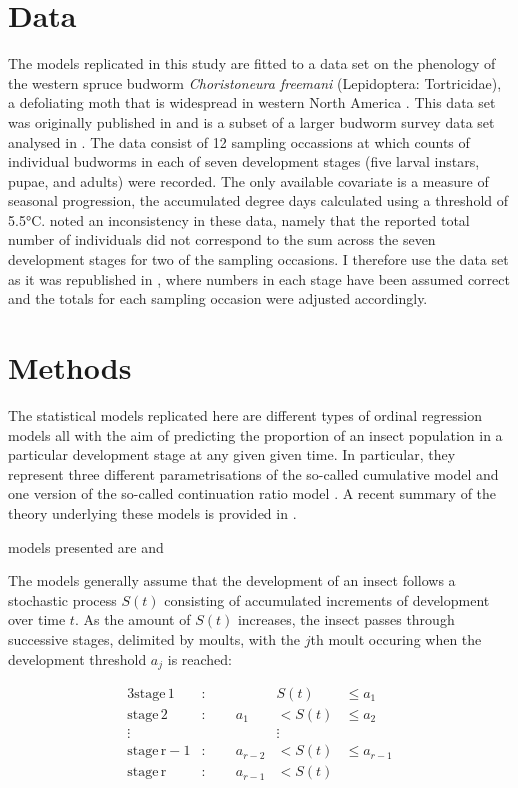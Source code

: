 \section{Data}
The models replicated in this study are fitted to a data set on the phenology of the western spruce budworm \emph{Choristoneura freemani} (Lepidoptera: Tortricidae), a defoliating moth that is widespread in western North America \citep{brookes1987western}. This data set was originally published in \citep{dennis1986stochastic} and is a subset of a larger budworm survey data set analysed in \citep{kemp1986}. The data consist of 12 sampling occassions at which counts of individual budworms in each of seven development stages (five larval instars, pupae, and adults) were recorded. The only available covariate is a measure of seasonal progression, the accumulated degree days calculated using a threshold of 5.5°C. \citet{candy1991modeling} noted an inconsistency in these data, namely that the reported total number of individuals did not correspond to the sum across the seven development stages for two of the sampling occasions. I therefore use the data set as it was republished in \citet{candy1990biology}, where numbers in each stage have been assumed correct and the totals for each sampling occasion were adjusted accordingly.

\section{Methods}
The statistical models replicated here are different types of ordinal regression models \citep{agresti} all with the aim of predicting the proportion of an insect population in a particular development stage at any given given time. In particular, they represent three different parametrisations of the so-called cumulative model and one version of the so-called continuation ratio model \citep{}. A recent summary of the theory underlying these models is provided in \citep{buerkner?}.


models presented are  \citet{dennis1986stochastic} and \citet{candy1991modeling} 

The models generally assume that the development of an insect follows a stochastic process $S(t)$ consisting of accumulated increments of development over time $t$. As the amount of $S(t)$ increases, the insect passes through successive stages, delimited by moults, with the $j$th moult occuring when the development threshold $a_j$ is reached:

\begin{alignat*}{3}
  \mathrm{stage\,1}&:\qquad {}&   S(t) & \leq a_1 \\
  \mathrm{stage\,2}&:\qquad  a_1&< S(t) & \leq a_2 \\
  \vdots & &\vdots \\
  \mathrm{stage\,r-1}&:\qquad  a_{r-2}&< S(t) & \leq a_{r-1} \\
  \mathrm{stage\,r}&:\qquad  a_{r-1}&< S(t) 
\end{alignat*}


